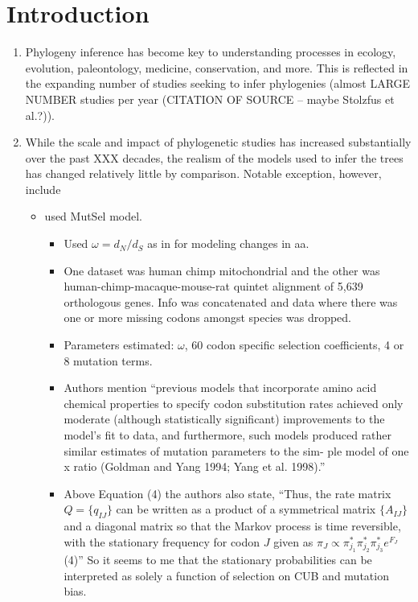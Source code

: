 \documentclass{article}
\begin{document}
\section*{Introduction}
\begin{enumerate}
\item Phylogeny inference has become key to understanding processes in ecology, evolution, paleontology, medicine, conservation, and more.
  This is reflected in the expanding number of studies seeking to infer phylogenies (almost LARGE NUMBER studies per year (CITATION OF SOURCE -- maybe Stolzfus et al.?)).
\item While the scale and impact of phylogenetic studies has increased substantially over the past XXX decades, the realism of the models used to infer the trees has changed relatively little by comparison.
  Notable exception, however, include
  \begin{itemize}
  \item \citet{YangAndNielsen08} used MutSel model.
    \begin{itemize}
    \item Used $\omega = d_N/d_S$ as in \citet{GoldmanAndYang94} for modeling changes in aa.
    \item One dataset was human chimp mitochondrial and the other was human-chimp-macaque-mouse-rat quintet alignment of 5,639 orthologous genes.
      Info was concatenated and data where there was one or more missing codons amongst species was dropped.
    \item Parameters estimated: $\omega$, 60 codon specific selection coefficients, 4 or 8 mutation terms.
      \item Authors mention ``previous models that incorporate amino acid chemical properties to specify codon substitution rates achieved only moderate (although statistically significant) improvements to the model’s fit to data, and furthermore, such models produced rather similar estimates of mutation parameters to the sim- ple model of one x ratio (Goldman and Yang 1994; Yang et al. 1998).''
      \item Above Equation (4) the authors also state, ``Thus, the rate matrix $Q = \{q_{IJ}\}$ can
be written as a product of a symmetrical matrix $\{A_{IJ}\}$ and a diagonal matrix so that the Markov process is time reversible, with the stationary frequency for codon $J$ given as
$\pi_J \propto \pi^*_{j_{1}} \pi^*_{j_{2}} \pi^*_{j_{3}} e^{F_J}$ (4)''
So it seems to me that the stationary probabilities can be interpreted as solely a function of selection on CUB and mutation bias.

\end{itemize}
\end{itemize}
\end{enumerate}
\end{document}
